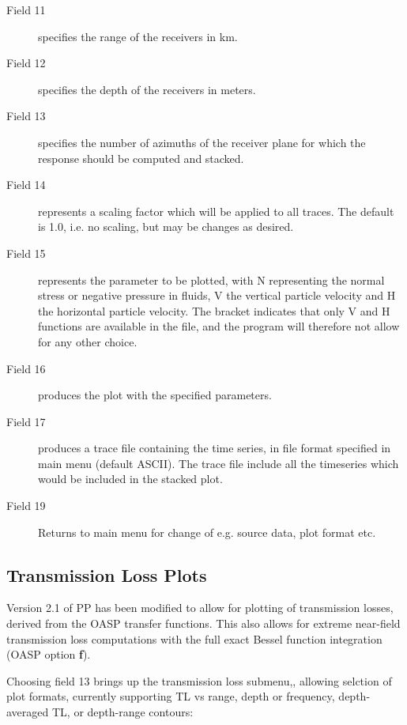 \begin{description}
\item[Field 11] specifies the range of the receivers in km.
\item[Field 12] specifies the depth of the receivers in meters.
\item[Field 13] specifies the number of azimuths of the receiver plane
          for which the response should be computed and stacked.
\item[Field 14] represents a scaling factor which will be applied to 
          all  traces. The default is 1.0, i.e. no  scaling,  but 
          may be changes as desired.
\item[Field 15]  represents  the  parameter to be  plotted,  with  N 
          representing the normal stress or negative pressure  in 
          fluids,  V  the vertical particle velocity  and  H  the 
          horizontal  particle  velocity. The  bracket  indicates 
          that   only V and H   functions   are 
          available  in the file, and the program will  therefore 
          not allow for any other choice.
\item[Field 16] produces the plot with the specified parameters.
\item[Field 17] produces  a  trace file containing  the  time 
          series, in file format specified in main menu (default
          ASCII). The trace file include all the timeseries which
          would be included in the stacked plot. 
\item[Field 19] Returns to main menu for change of e.g. source data, 
          plot format etc. 
\end{description} 

\newpage
\subsection{Transmission Loss Plots}

Version 2.1 of PP has been modified to allow for plotting of
transmission losses, derived from the OASP transfer functions. This
also allows for extreme near-field transmission loss computations with
the full exact Bessel function integration (OASP option {\bf f}). 

Choosing field 13 brings up the transmission loss submenu,, allowing
selction of plot formats, currently supporting TL vs range, depth or
frequency, depth-averaged TL, or depth-range contours:

